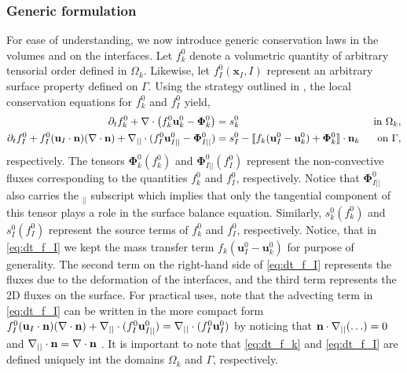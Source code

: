 \subsubsection{Generic formulation}

For ease of understanding, we now introduce generic conservation laws in the volumes and on the interfaces. 
Let $f_k^0$ denote a volumetric quantity of arbitrary tensorial order defined in $\Omega_k$.
Likewise, let $f_I^0(\textbf{x}_I,I)$ represent an arbitrary surface property defined on $\Gamma$.
Using the strategy outlined in \citep{ishii2010thermo,bothe2022sharp}, the local conservation equations for $f_k^0$ and $f_I^0$ yield,  
\begin{align}
    \label{eq:dt_f_k}
    \partial_t f_k^0
    +\mathbf{\nabla}\cdot \left(
        f_k^0\textbf{u}_k^0
        - \mathbf{\Phi}_k^0
        \right)
    &= 
    s_k^0
    & \text{ in } \Omega_k,&\\
    \partial_t f_I^0 
    + f_I^0 (\textbf{u}_I \cdot \textbf{n})(\mathbf{\nabla}\cdot \textbf{n})
    +\mathbf{\nabla}_{||}\cdot
    (f_I^0 \textbf{u}_{I||}^0
        - \mathbf{\Phi}_{I||}^0 )
    &= 
    s_I^0
    - \llbracket 
       f_k (\textbf{u}_I^0 - \textbf{u}_k^0)
       + \mathbf{\Phi}_k^0
     \rrbracket \cdot \textbf{n}_k 
    & \text{ on } \Gamma,&
    \label{eq:dt_f_I}
\end{align}
respectively.
The tensors $\mathbf{\Phi}_k^0(f_k^0)$ and $\mathbf{\Phi}_{I||}^0(f_I^0)$ represent the non-convective fluxes corresponding to the quantities $f_k^0$ and $f_I^0$, respectively. 
Notice that $\mathbf{\Phi}_{I||}^0$ also carries the $_{||}$ subscript which implies that only the tangential component of this tensor plays a role in the surface balance equation. 
Similarly, $s_k^0(f_k^0)$ and $s_I^0(f_I^0)$ represent the source terms of $f_k^0$ and $f_I^0$, respectively.
Notice, that in \ref{eq:dt_f_I} we kept the mass transfer term $f_k (\textbf{u}_I^0 - \textbf{u}_k^0)$ for purpose of generality. 
The second term on the right-hand side of \ref{eq:dt_f_I} represents the fluxes due to the deformation of the interfaces, and the third term represents the 2D fluxes on the surface. 
For practical uses, note that the advecting term in \ref{eq:dt_f_I} can be written in the more compact form $f_I^0 (\textbf{u}_I \cdot \textbf{n})(\mathbf{\nabla}\cdot \textbf{n})
+\mathbf{\nabla}_{||}\cdot(f_I^0 \textbf{u}_{I||}^0) = \mathbf{\nabla}_{||}\cdot(f_I^0 \textbf{u}_I^0)$ by noticing that $\textbf{n}\cdot\mathbf{\nabla}_{||}(\ldots) = 0$ and $\mathbf{\nabla}_{||}\cdot\textbf{n} = \mathbf{\nabla}\cdot\textbf{n}$ \citep{nadim1996concise}.
It is important to note that \ref{eq:dt_f_k} and \ref{eq:dt_f_I} are defined uniquely int the domains $\Omega_k$ and $\Gamma$, respectively.


